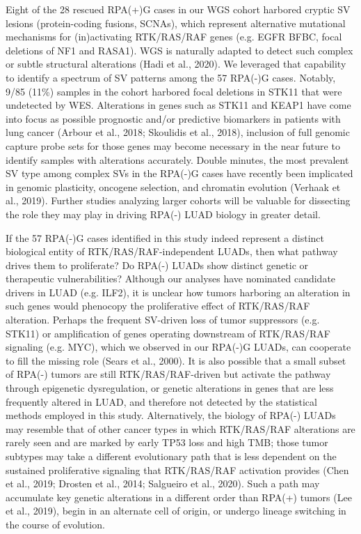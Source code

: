 \documentclass[phd,tocprelim]{cornell}
\begin{document}
Eight of the 28 rescued RPA(+)G cases in our WGS cohort harbored cryptic SV lesions (protein-coding fusions, SCNAs), which represent alternative mutational mechanisms for (in)activating RTK/RAS/RAF genes (e.g. EGFR BFBC, focal deletions of NF1 and RASA1). WGS is naturally adapted to detect such complex or subtle structural alterations (Hadi et al., 2020). We leveraged that capability to identify a spectrum of SV patterns among the 57 RPA(-)G cases. Notably, 9/85 (11\%) samples in the cohort harbored focal deletions in STK11 that were undetected by WES. Alterations in genes such as STK11 and KEAP1 have come into focus as possible prognostic and/or predictive biomarkers in patients with lung cancer (Arbour et al., 2018; Skoulidis et al., 2018), inclusion of full genomic capture probe sets for those genes may become necessary in the near future to identify samples with alterations accurately. Double minutes, the most prevalent SV type among complex SVs in the RPA(-)G cases have recently been implicated in genomic plasticity, oncogene selection, and chromatin evolution (Verhaak et al., 2019). Further studies analyzing larger cohorts will be valuable for dissecting the role they may play in driving RPA(-) LUAD biology in greater detail.

If the 57 RPA(-)G cases identified in this study indeed represent a distinct biological entity of RTK/RAS/RAF-independent LUADs, then what pathway drives them to proliferate? Do RPA(-) LUADs show distinct genetic or therapeutic vulnerabilities? Although our analyses have nominated candidate drivers in LUAD (e.g. ILF2), it is unclear how tumors harboring an alteration in such genes would phenocopy the proliferative effect of RTK/RAS/RAF alteration. Perhaps the frequent SV-driven loss of tumor suppressors (e.g. STK11) or amplification of genes operating downstream of RTK/RAS/RAF signaling (e.g. MYC), which we observed in our RPA(-)G LUADs, can cooperate to fill the missing role (Sears et al., 2000). It is also possible that a small subset of RPA(-) tumors are still RTK/RAS/RAF-driven but activate the pathway through epigenetic dysregulation, or genetic alterations in genes that are less frequently altered in LUAD, and therefore not detected by the statistical methods employed in this study. Alternatively, the biology of RPA(-) LUADs may resemble that of other cancer types in which RTK/RAS/RAF alterations are rarely seen and are marked by early TP53 loss and high TMB; those tumor subtypes may take a different evolutionary path that is less dependent on the sustained proliferative signaling that RTK/RAS/RAF activation provides (Chen et al., 2019; Drosten et al., 2014; Salgueiro et al., 2020). Such a path may accumulate key genetic alterations in a different order than RPA(+) tumors (Lee et al., 2019), begin in an alternate cell of origin, or undergo lineage switching in the course of evolution.
\end{document}
